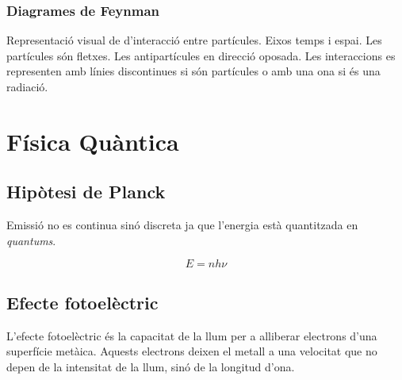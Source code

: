 \subsubsection{Diagrames de Feynman}
\label{ssub:diagrames_de_feynman}

Representació visual de d'interacció entre partícules. Eixos temps i espai.
Les partícules són fletxes. Les antipartícules en direcció oposada. Les
interaccions es representen amb línies discontinues si són partícules o amb una
ona si és una radiació.

\begin{center}
\end{center}

\section{Física Quàntica}
\label{sec:fisica_quantica}

\subsection{Hipòtesi de Planck}
\label{sub:hipotesi_de_planck}

Emissió no es continua sinó discreta ja que l'energia està quantitzada en 
\emph{quantums}.

\begin{equation}
    E = n h \nu
\end{equation}

\subsection{Efecte fotoelèctric}
\label{sub:efecte_fotoelectric}

L'efecte fotoelèctric és la capacitat de la llum per a alliberar electrons
d'una superfície metà\lgem ica. Aquests electrons deixen el metall a una
velocitat que no depen de la intensitat de la llum, sinó de la longitud d'ona.


